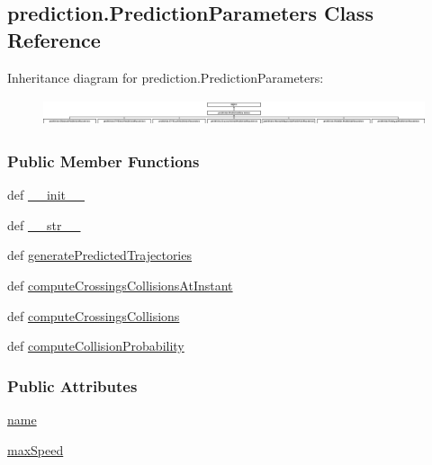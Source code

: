 \hypertarget{classprediction_1_1PredictionParameters}{\subsection{prediction.\-Prediction\-Parameters Class Reference}
\label{classprediction_1_1PredictionParameters}
}
Inheritance diagram for prediction.\-Prediction\-Parameters\-:\begin{figure}[H]
\begin{center}
\leavevmode
\includegraphics[height=0.797342cm]{classprediction_1_1PredictionParameters}
\end{center}
\end{figure}
\subsubsection*{Public Member Functions}
\begin{DoxyCompactItemize}
\item 
def \hyperlink{classprediction_1_1PredictionParameters_a2bc846706f44db9aee7be414c7876b0e}{\-\_\-\-\_\-init\-\_\-\-\_\-}
\item 
def \hyperlink{classprediction_1_1PredictionParameters_a8630b919e5af565a1f755e8bc7c97317}{\-\_\-\-\_\-str\-\_\-\-\_\-}
\item 
def \hyperlink{classprediction_1_1PredictionParameters_a2288708cc66b10f251b16e6954f19e86}{generate\-Predicted\-Trajectories}
\item 
def \hyperlink{classprediction_1_1PredictionParameters_ad99f4942743514bad8eb870f95136964}{compute\-Crossings\-Collisions\-At\-Instant}
\item 
def \hyperlink{classprediction_1_1PredictionParameters_abe5a90b1762ee95353b9acbe6f98df9a}{compute\-Crossings\-Collisions}
\item 
def \hyperlink{classprediction_1_1PredictionParameters_add13fc0a539ca2cffaa630e5de421607}{compute\-Collision\-Probability}
\end{DoxyCompactItemize}
\subsubsection*{Public Attributes}
\begin{DoxyCompactItemize}
\item 
\hyperlink{classprediction_1_1PredictionParameters_a801f3373849862455991db0882908ea2}{name}
\item 
\hyperlink{classprediction_1_1PredictionParameters_aecd38f89045d75366021047fb06fe885}{max\-Speed}
\end{DoxyCompactItemize}


